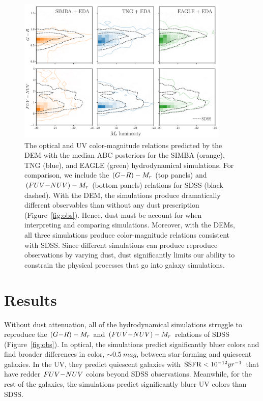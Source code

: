 \begin{figure}
\begin{center}
    \includegraphics[width=0.9\textwidth]{figs/abc_observables.pdf}
    \caption{\label{fig:dem}
    The optical and UV color-magnitude relations predicted by the DEM with 
    the median ABC posteriors for the SIMBA (orange), TNG (blue), and EAGLE
    (green) hydrodynamical simulations. For comparison, we include the 
    $(G{-}R) - M_r$ (top panels) and $(FUV{-}NUV) - M_r$ (bottom panels) relations
    for SDSS (black dashed). With the DEM, the simulations produce dramatically 
    different observables than without any dust prescription (Figure~\ref{fig:obs}). 
    Hence, dust must be account for when interpreting and comparing simulations.
    Moreover, with the DEMs, all three simulations produce color-magnitude
    relations consistent with SDSS. Since different simulations can 
    produce reproduce observations by varying dust, dust significantly limits
    our ability to constrain the physical processes that go into galaxy
    simulations. 
    }
\end{center}
\end{figure}

\section{Results} \label{sec:results}
Without dust attenuation, all of the hydrodynamical simulations struggle to 
reproduce the $(G{-}R) - M_r$ and $(FUV{-}NUV) - M_r$ relations of SDSS (Figure~\ref{fig:obs}). 
In optical, the simulations predict significantly bluer colors and find  
broader differences in color, ${\sim}0.5~mag$, between star-forming and
quiescent galaxies. In the UV, they predict quiescent galaxies with ${\rm SSFR} <
10^{-12}yr^{-1}$ that have redder $FUV{-}NUV$ colors beyond SDSS observations. 
Meanwhile, for the rest of the galaxies, the simulations predict significantly
bluer UV colors than SDSS. 

